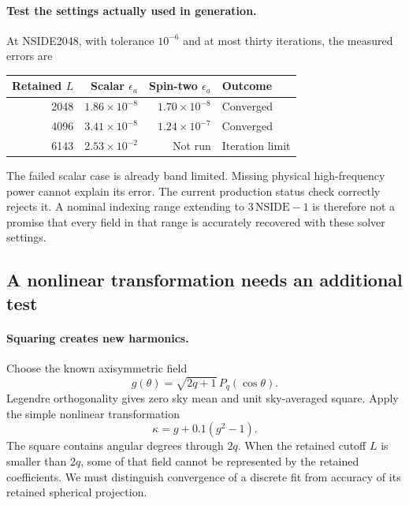 \documentclass[11pt]{article}
\begin{document}
\paragraph{Test the settings actually used in generation.}
At NSIDE2048, with tolerance $10^{-6}$ and at most thirty iterations, the
measured errors are
\begin{center}
\begin{tabular}{rrrl}
\toprule
Retained $L$ & Scalar $\epsilon_a$ & Spin-two $\epsilon_a$ & Outcome\\
\midrule
2048 & $1.86\times10^{-8}$ & $1.70\times10^{-8}$ & Converged\\
4096 & $3.41\times10^{-8}$ & $1.24\times10^{-7}$ & Converged\\
6143 & $2.53\times10^{-2}$ & Not run & Iteration limit\\
\bottomrule
\end{tabular}
\end{center}
The failed scalar case is already band limited. Missing physical
high-frequency power cannot explain its error. The current production
status check correctly rejects it. A nominal indexing range extending to
$3\,\mathrm{NSIDE}-1$ is therefore not a promise that every field in that
range is accurately recovered with these solver settings.

\subsection{A nonlinear transformation needs an additional test}
\paragraph{Squaring creates new harmonics.}
Choose the known axisymmetric field
\begin{equation}
 g(\theta)=\sqrt{2q+1}\,P_q(\cos\theta).
\end{equation}
Legendre orthogonality gives zero sky mean and unit sky-averaged square.
Apply the simple nonlinear transformation
\begin{equation}
 \kappa=g+0.1(g^2-1).
\end{equation}
The square contains angular degrees through $2q$. When the retained cutoff
$L$ is smaller than $2q$, some of that field cannot be represented by the
retained coefficients. We must distinguish convergence of a discrete fit
from accuracy of its retained spherical projection.
\end{document}
